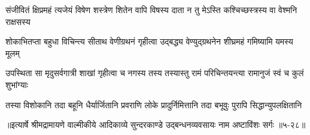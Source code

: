 \twolineshloka
{संजीवितं क्षिप्रमहं त्यजेयं विषेण शस्त्रेण शितेन वापि}
{विषस्य दाता न तु मेऽस्ति कश्चिच्छस्त्रस्य वा वेश्मनि राक्षसस्य} %

\twolineshloka
{शोकाभितप्ता बहुधा विचिन्त्य सीताथ वेणीग्रथनं गृहीत्वा}
{उद्बद्ध्य वेण्युद्ग्रथनेन शीघ्रमहं गमिष्यामि यमस्य मूलम्} %

\twolineshloka
{उपस्थिता सा मृदुसर्वगात्री शाखां गृहीत्वा च नगस्य तस्य}
{तस्यास्तु रामं परिचिन्तयन्त्या रामानुजं स्वं च कुलं शुभांग्याः} %

\twolineshloka
{तस्या विशोकानि तदा बहूनि धैर्यार्जितानि प्रवराणि लोके}
{प्रादुर्निमित्तानि तदा बभूवुः पुरापि सिद्धान्युपलक्षितानि} %


॥इत्यार्षे श्रीमद्रामायणे वाल्मीकीये आदिकाव्ये सुन्दरकाण्डे उद्बन्धनव्यवसायः नाम अष्टाविंशः सर्गः ॥५-२८॥
